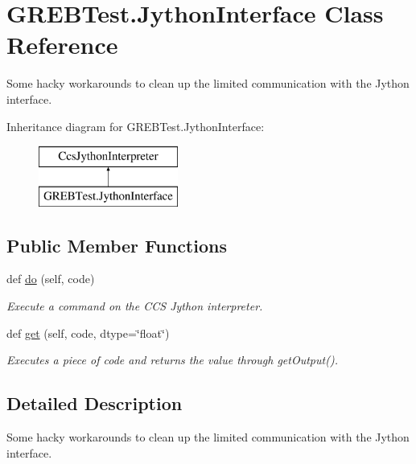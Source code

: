 \hypertarget{class_g_r_e_b_test_1_1_jython_interface}{}\section{G\+R\+E\+B\+Test.\+Jython\+Interface Class Reference}
\label{class_g_r_e_b_test_1_1_jython_interface}


Some hacky workarounds to clean up the limited communication with the Jython interface.  


Inheritance diagram for G\+R\+E\+B\+Test.\+Jython\+Interface\+:\begin{figure}[H]
\begin{center}
\leavevmode
\includegraphics[height=2.000000cm]{class_g_r_e_b_test_1_1_jython_interface}
\end{center}
\end{figure}
\subsection*{Public Member Functions}
\begin{DoxyCompactItemize}
\item 
def \hyperlink{class_g_r_e_b_test_1_1_jython_interface_a8eef0a16132a249df6cc0a6e59929759}{do} (self, code)
\begin{DoxyCompactList}\small\item\em Execute a command on the C\+CS Jython interpreter. \end{DoxyCompactList}\item 
def \hyperlink{class_g_r_e_b_test_1_1_jython_interface_a5ffb7d0428e6d695cd344db062c39ed4}{get} (self, code, dtype=\char`\"{}float\char`\"{})
\begin{DoxyCompactList}\small\item\em Executes a piece of code and returns the value through get\+Output(). \end{DoxyCompactList}\end{DoxyCompactItemize}


\subsection{Detailed Description}
Some hacky workarounds to clean up the limited communication with the Jython interface. 



